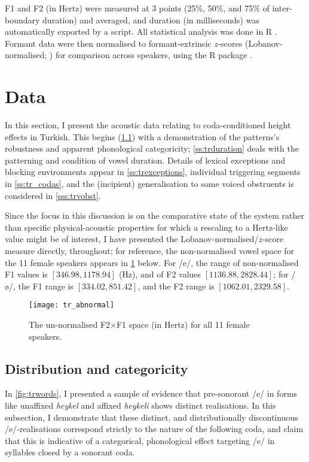 F1 and F2 (in Hertz) were measured at 3 points (25\%, 50\%, and 75\% of inter-boundary duration) and averaged, and duration (in milliseconds) was automatically exported by a  script. All statistical analysis was done in R \citep{R}. Formant data were then normalised to formant-extrinsic $z$-scores (Lobanov-normalised; \citealt{Lobanov1971, Adank2004}) for comparison across speakers, using the R  package \citep{phonR}.

\section{Data}\label{s:trdata}

In this section, I present the acoustic data relating to coda-conditioned height effects in Turkish. This begins (\cref{ss:distrib}) with a demonstration of the patterns's robustness and apparent phonological categoricity; \cref{ss:trduration} deals with the patterning and condition of vowel duration. Details of lexical exceptions and blocking environments appear in  \cref{ss:trexceptions}, individual triggering segments in \cref{ss:tr_codas}, and the (incipient) generalisation to some voiced obstruents is considered in \cref{sss:trvobst}.

Since the focus in this discussion is on the comparative state of the system rather than specific physical-acoustic properties for which a rescaling to a Hertz-like value might be of interest, I have presented the Lobanov-normalised/$z$-score measure directly, throughout; for reference, the non-normalised vowel space for the 11 female speakers appears in \cref{fig:tr_abnormal} below. For /e/, the range of non-normalised F1 values is $[346.98,1178.94]$ (Hz), and of F2 values $[1136.88,2828.44]$; for /ø/, the F1 range is $[334.02, 851.42]$, and the F2 range is $[1062.01, 2329.58]$.

\begin{figure}[H]
  \centering
  \texttt{[image: tr\_abnormal]}
  \caption[Non-normalised F2$\times$F1 space, over all speakers and all vowels.]{The un-normalised F2$\times$F1 space (in Hertz) for all 11 female speakers.}
  \label{fig:tr_abnormal}
\end{figure}

\subsection{Distribution and categoricity}\label{ss:distrib}

In \cref{fig:trwords}, I presented a sample of evidence that pre-sonorant /e/ in forms like unaffixed \emph{heykel} and affixed \emph{heykeli} shows distinct realisations. In this subsection, I demonstrate that these distinct, and distributionally discontinuous /e/-realisations correspond strictly to the nature of the following coda, and claim that this is indicative of a categorical, phonological effect targeting /e/ in syllables closed by a sonorant coda.

